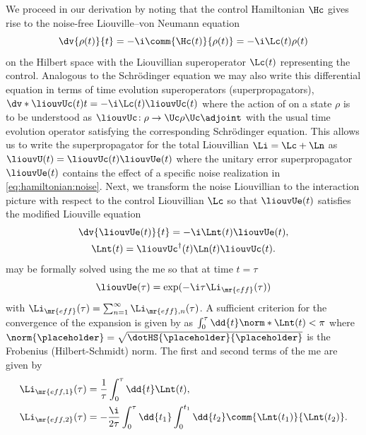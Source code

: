 We proceed in our derivation by noting that the control Hamiltonian $\Hc$ gives rise to the noise-free Liouville--von Neumann equation
\begin{equation}\label{liouville-von-neumann}
    \dv{\rho(t)}{t} = -\i\comm{\Hc(t)}{\rho(t)} =  -\i\Lc(t)\rho(t)
\end{equation}
on the Hilbert space \Hspace with the Liouvillian superoperator $\Lc(t)$ representing the control. Analogous to the Schr\"odinger equation we may also write this differential equation in terms of time evolution superoperators (superpropagators), $\dv*{\liouvUc(t)}{t} = -\i\Lc(t)\liouvUc(t)$ where the action of \liouvUc on a state $\rho$ is to be understood as $\liouvUc\!: \rho\rightarrow\Uc\rho\Uc\adjoint$ with \Uc the usual time evolution operator satisfying the corresponding Schr\"odinger equation. This allows us to write the superpropagator for the total Liouvillian $\Li = \Lc + \Ln$ as $\liouvU(t) = \liouvUc(t)\liouvUe(t)$ where the unitary error superpropagator $\liouvUe(t)$ contains the effect of a specific noise realization in \cref{eq:hamiltonian:noise}. Next, we transform the noise Liouvillian \Ln to the interaction picture with respect to the control Liouvillian $\Lc$ so that $\liouvUe(t)$ satisfies the modified Liouville equation
\begin{gather}
    \dv{\liouvUe(t)}{t} = -\i\Lnt(t)\liouvUe(t),    \label{eq:le:interaction_picture} \\
    \Lnt(t) = \liouvUc^\dagger(t)\Ln(t)\liouvUc(t). \label{eq:liouvillian:interaction_picture}
\end{gather}
 may be formally solved using the \acrlong{me} \cite{Magnus1954} so that at time $t=\tau$
\begin{equation}\label{eq:error_propagator}
    \liouvUe(\tau) = \exp(-\i\tau\Li_\mr{eff}(\tau))
\end{equation}
with $\Li_\mr{eff}(\tau) = \sum_{n=1}^\infty\Li_{\mr{eff},n}(\tau)$. A sufficient criterion for the convergence of the expansion is given by \citeauthor{Moan1999} as $\int_0^\tau\dd{t}\norm*{\Lnt(t)} < \pi$ where $\norm{\placeholder} = \sqrt{\dotHS{\placeholder}{\placeholder}}$ is the Frobenius (Hilbert-Schmidt) norm. The first and second terms of the \gls{me} are given by \cite{Magnus1954,Blanes2009}
\begin{subequations}\label{eq:magnus_expansion}
\begin{align}
    \Li_\mr{eff,1}(\tau) &= \frac{1}{\tau}\int_0^\tau\dd{t}\Lnt(t), \label{eq:magnus_expansion:1}\\
    \Li_\mr{eff,2}(\tau) &= -\frac{\i}{2\tau}\int_0^\tau\dd{t_1}\int_0^{t_1}\dd{t_2}\comm{\Lnt(t_1)}{\Lnt(t_2)}. \label{eq:magnus_expansion:2}
\end{align}
\end{subequations}
